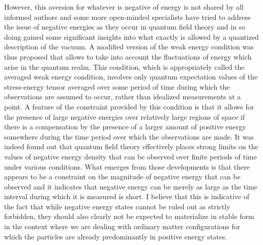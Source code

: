 \documentclass[notitlepage,12pt]{report}
\begin{document}
However, this aversion for whatever is negative of energy is not shared by all informed authors and some more open-minded specialists have tried to address the issue of negative energies as they occur in quantum field theory and in so doing gained some significant insights into what exactly is allowed by a quantized description of the vacuum. A modified version of the weak energy condition was thus proposed that allows to take into account the fluctuations of energy which arise in the quantum realm. This condition, which is appropriately called the averaged weak energy condition, involves only quantum expectation values of the stress-energy tensor averaged over some period of time during which the observations are assumed to occur, rather than idealized measurements at a point. A feature of the constraint provided by this condition is that it allows for the presence of large negative energies over relatively large regions of space if there is a compensation by the presence of a larger amount of positive energy somewhere during the time period over which the observations are made. It was indeed found out \cite{Ford-1,Ford-2,Pfenning-1,Pfenning-2} that quantum field theory effectively places strong limits on the values of negative energy density that can be observed over finite periods of time under various conditions. What emerges from those developments is that there appears to be a constraint on the magnitude of negative energy that can be observed and it indicates that negative energy can be merely as large as the time interval during which it is measured is short. I believe that this is indicative of the fact that while negative energy states cannot be ruled out as strictly forbidden, they should also clearly not be expected to materialize in stable form in the context where we are dealing with ordinary matter configurations for which the particles are already predominantly in positive energy states.
\end{document}

